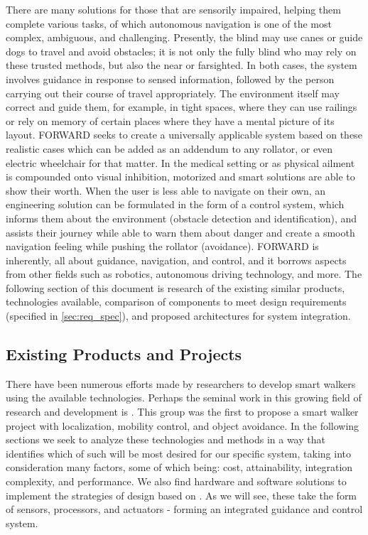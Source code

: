 \noindent There are many solutions for those that are sensorily impaired, helping them complete various tasks, of which autonomous navigation is one of the most complex, ambiguous, and challenging. Presently, the blind may use canes or guide dogs to travel and avoid obstacles; it is not only the fully blind who may rely on these trusted methods, but also the near or farsighted.  In both cases, the system involves guidance in response to sensed information, followed by the person carrying out their course of travel appropriately. The environment itself may correct and guide them, for example, in tight spaces, where they can use railings or rely on memory of certain places where they have a mental picture of its layout. FORWARD seeks to create a universally applicable system based on these realistic cases which can be added as an addendum to any rollator, or even electric wheelchair for that matter. In the medical setting or as physical ailment is compounded onto visual inhibition, motorized and smart solutions are able to show their worth. When the user is less able to navigate on their own, an engineering solution can be formulated in the form of a control system, which informs them about the environment (obstacle detection and identification), and assists their journey while able to warn them about danger and create a smooth navigation feeling while pushing the rollator (avoidance). FORWARD is inherently, all about guidance, navigation, and control, and it borrows aspects from other fields such as robotics, autonomous driving technology, and more. The following section of this document is research of the existing similar products, technologies available, comparison of components to meet design requirements (specified in \ref{sec:req_spec}), and proposed architectures for system integration.\\

\subsection{Existing Products and Projects}

\noindent There have been numerous efforts made by researchers to develop smart walkers using the available technologies. Perhaps the seminal work in this growing field of research and development is \cite{PAMM}. This group was the first to propose a smart walker project with localization, mobility control, and object avoidance. In the following sections we seek to analyze these technologies and methods in a way that identifies which of such will be most desired for our specific system, taking into consideration many factors, some of which being: cost, attainability, integration complexity, and performance. We also find hardware and software solutions to implement the strategies of design based on \cite{PAMM}. As we will see, these take the form of sensors, processors, and actuators - forming an integrated guidance and control system.\\

